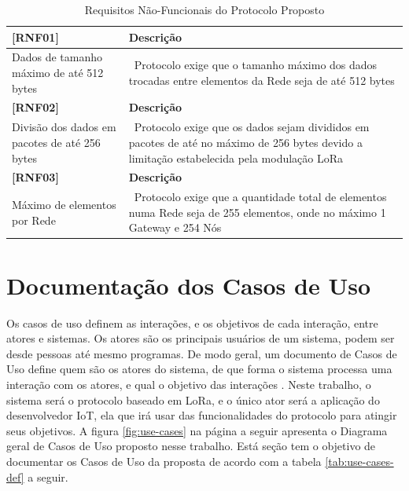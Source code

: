 \begin{longtable}{|p{3.5cm}|p{9.0cm}|}
    \caption{Requisitos Não-Funcionais do Protocolo Proposto}\label{tab:rnfs}\\
    \hline
    \textbf{[RNF01]} & \textbf{Descrição} \\
    \hline
    Dados de \newline tamanho máximo \newline de até 512 bytes & \
    Protocolo exige que o tamanho máximo dos dados trocadas entre elementos da Rede seja de até 512 bytes \\
    \hline
    \textbf{[RNF02]} & \textbf{Descrição} \\
    \hline
    Divisão dos dados em pacotes de até 256 bytes & \
    Protocolo exige que os dados sejam divididos em pacotes de até no máximo de 256 bytes devido a limitação estabelecida pela modulação LoRa \\
    \hline
    \textbf{[RNF03]} & \textbf{Descrição} \\
    \hline
    Máximo de \newline 255 elementos \newline por Rede & \
    Protocolo exige que a quantidade total de elementos numa Rede seja de 255 elementos, onde no máximo 1 Gateway e 254 Nós \\
    \hline
\end{longtable}

\section{Documentação dos Casos de Uso}

Os casos de uso definem as interações, e os objetivos de cada interação, entre atores e sistemas.
Os atores são os principais usuários de um sistema, podem ser desde pessoas até mesmo
programas. De modo geral, um documento de Casos de Uso define quem são os atores do sistema,
de que forma o sistema processa uma interação com os atores, e qual o objetivo das interações
\cite{malan2001functional}. Neste trabalho, o sistema será o protocolo baseado em LoRa,
e o único ator será a aplicação do desenvolvedor IoT, ela que irá usar das funcionalidades
do protocolo para atingir seus objetivos. A figura \ref{fig:use-cases} na página a seguir
apresenta o Diagrama geral de Casos de Uso proposto nesse trabalho. Está seção tem o objetivo
de documentar os Casos de Uso da proposta de acordo com a tabela
\ref{tab:use-cases-def} a seguir.

